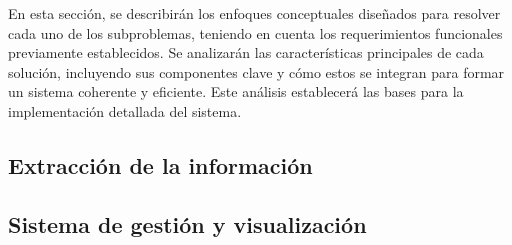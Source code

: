 En esta sección, se describirán los enfoques conceptuales diseñados para resolver cada 
uno de los subproblemas, teniendo en cuenta los requerimientos funcionales previamente establecidos. 
Se analizarán las características principales de cada solución, incluyendo sus componentes clave y cómo 
estos se integran para formar un sistema coherente y eficiente. Este análisis establecerá las bases 
para la implementación detallada del sistema.

\subsection{Extracción de la información}
\subsection{Sistema de gestión y visualización}